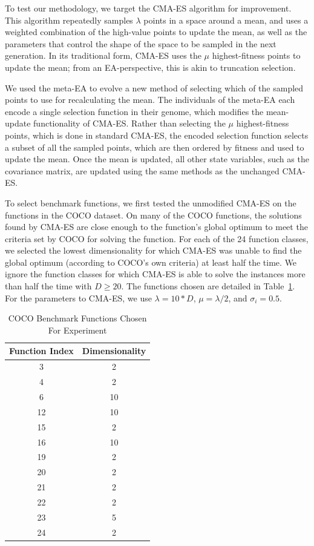 \documentclass[sigconf]{acmart}
\begin{document}
To test our methodology, we target the CMA-ES algorithm for improvement. This algorithm repeatedly samples $\lambda$ points in a space around a mean, and uses a weighted combination of the high-value points to update the mean, as well as the parameters that control the shape of the space to be sampled in the next generation. In its traditional form, CMA-ES uses the $\mu$ highest-fitness points to update the mean; from an EA-perspective, this is akin to truncation selection. 

We used the meta-EA to evolve a new method of selecting which of the sampled points to use for recalculating the mean. The individuals of the meta-EA each encode a single selection function in their genome, which modifies the mean-update functionality of CMA-ES. Rather than selecting the $\mu$ highest-fitness points, which is done in standard CMA-ES, the encoded selection function selects a subset of all the sampled points, which are then ordered by fitness and used to update the mean. Once the mean is updated, all other state variables, such as the covariance matrix, are updated using the same methods as the unchanged CMA-ES.

To select benchmark functions, we first tested the unmodified CMA-ES on the functions in the COCO dataset. On many of the COCO functions, the solutions found by CMA-ES are close enough to the function's global optimum to meet the criteria set by COCO for solving the function. For each of the 24 function classes, we selected the lowest dimensionality for which CMA-ES was unable to find the global optimum (according to COCO's own criteria) at least half the time. We ignore the function classes for which CMA-ES is able to solve the instances more than half the time with $D\geq20$. The functions chosen are detailed in Table~\ref{tab:experiment3chosenFunctions}. For the parameters to CMA-ES, we use $\lambda=10*D$, $\mu = \lambda/2$, and $\sigma_i = 0.5$. 

\begin{table}
	\centering
	\caption{COCO Benchmark Functions Chosen For Experiment}
	\label{tab:experiment3chosenFunctions}
	\begin{tabular}{c|c}
		\toprule
		Function Index & Dimensionality \\
		\midrule
		3 & 2\\
		\hline
		4& 2\\
		\hline
		6& 10\\
		\hline
		12& 10\\
		\hline
		15& 2\\
		\hline
		16& 10\\
		\hline
		19& 2\\
		\hline
		20& 2\\
		\hline
		21& 2\\
		\hline
		22& 2\\
		\hline
		23& 5\\
		\hline
		24& 2\\                        
		
		\bottomrule
	\end{tabular}
\end{table}
\end{document}
